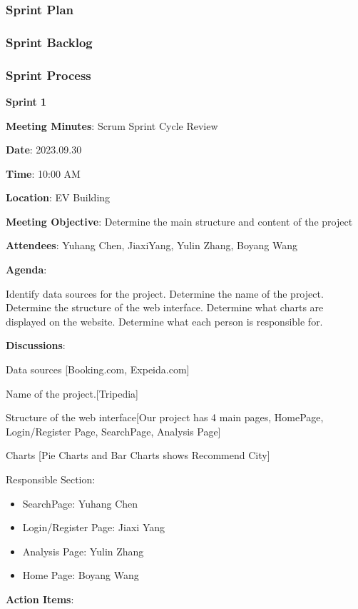 \documentclass[conference]{IEEEtran}
\begin{document}
\subsubsection{\textbf{Sprint Plan}}



\subsubsection{\textbf{Sprint Backlog}}

\subsubsection{\textbf{Sprint Process}}

\textbf{}

\textbf{Sprint 1}

\textbf{Meeting Minutes}: Scrum Sprint Cycle Review

\textbf{Date}: 2023.09.30

\textbf{Time}: 10:00 AM

\textbf{Location}: EV Building

\textbf{Meeting Objective}: Determine the main structure and content of the project

\textbf{Attendees}:
Yuhang Chen, JiaxiYang, Yulin Zhang, Boyang Wang

\textbf{Agenda}:

Identify data sources for the project.
Determine the name of the project.
Determine the structure of the web interface.
Determine what charts are displayed on the website.
Determine what each person is responsible for.

\textbf{Discussions}:

Data sources [Booking.com, Expeida.com]

Name of the project.[Tripedia]

Structure of the web interface[Our project has 4 main pages, HomePage, Login/Register Page, SearchPage, Analysis Page]

Charts [Pie Charts and Bar Charts shows Recommend City]

Responsible Section:
\begin{itemize}
\item SearchPage: Yuhang Chen
\item Login/Register Page: Jiaxi Yang
\item Analysis Page: Yulin Zhang
\item Home Page: Boyang Wang
\end{itemize}
\textbf{Action Items}:
\end{document}
